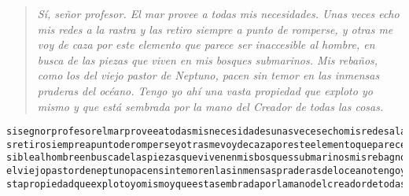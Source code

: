 \documentclass[
  a4paper,
  spanish,
  12pt,
]{scrartcl}
\begin{document}
\begin{quote}
  \itshape Sí, señor profesor. El mar provee a todas mis necesidades. Unas veces echo mis redes a la rastra y las retiro siempre a punto de romperse, y otras me voy de caza por este elemento que parece ser inaccesible al hombre, en busca de las piezas que viven en mis bosques submarinos. Mis rebaños, como los del viejo pastor de Neptuno, pacen sin temor en las inmensas praderas del océano. Tengo yo ahí una vasta propiedad que exploto yo mismo y que está sembrada por la mano del Creador de todas las cosas.
\end{quote}


\begin{lstlisting}[caption={Mensaje descifrado}, label={lst:descifrado}, breaklines=true]
sisegnorprofesorelmarproveeatodasmisnecesidadesunasvecesechomisredesalarastrayla
sretirosiempreapuntoderomperseyotrasmevoydecazaporesteelementoquepareceserinacce
siblealhombreenbuscadelaspiezasquevivenenmisbosquessubmarinosmisrebagnoscomolosd
elviejopastordeneptunopacensintemorenlasinmensaspraderasdeloceanotengoyoahiunava
stapropiedadqueexplotoyomismoyqueestasembradaporlamanodelcreadordetodaslascosas
\end{lstlisting}


\end{document}
